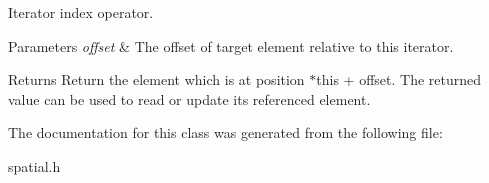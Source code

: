 Iterator index operator. 


\begin{DoxyParams}{Parameters}
{\em offset} & The offset of target element relative to this iterator. \\
\hline
\end{DoxyParams}
\begin{DoxyReturn}{Returns}
Return the element which is at position $\ast$this + offset. The returned value can be used to read or update its referenced element. 
\end{DoxyReturn}


The documentation for this class was generated from the following file\+:\begin{DoxyCompactItemize}
\item 
spatial.\+h\end{DoxyCompactItemize}
